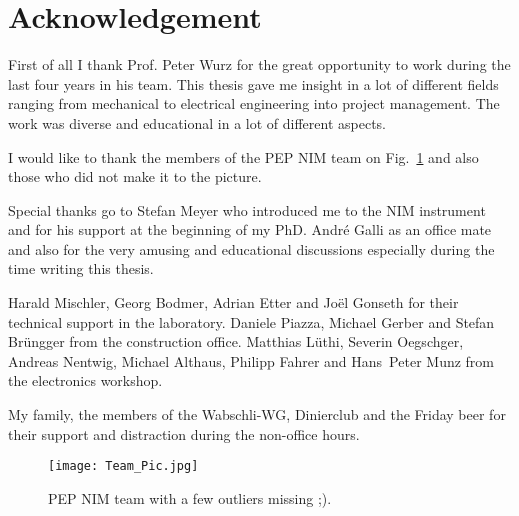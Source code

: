 \documentclass[a4paper, 12pt, abstracton]{scrartcl}
\begin{document}

	
	\newpage
	\thispagestyle{empty}
	\null
	\newpage
	
	\clearpage
	\newpage
	\thispagestyle{empty}
	\null
	\newpage
	
	\clearpage
	\newpage
	\thispagestyle{empty}
	\null
	\newpage
	
	\clearpage
	
	\clearpage
	
	\clearpage
	\newpage
	\thispagestyle{empty}
	\null
	\newpage
	
	\newpage
	\thispagestyle{empty}
	\null
	\newpage
	
	\section*{Acknowledgement}
	
	First of all I thank Prof. Peter Wurz for the great opportunity to work during the last four years in his team. This thesis gave me insight in a lot of different fields ranging from mechanical to electrical engineering into project management. The work was diverse and educational in a lot of different aspects.
	
	I would like to thank the members of the PEP NIM team on Fig.~\ref{fig:TeamPic} and also those who did not make it to the picture.
	
	Special thanks go to Stefan Meyer who introduced me to the NIM instrument and for his support at the beginning of my PhD. André Galli as an office mate and also for the very amusing and educational discussions especially during the time writing this thesis.
	
	Harald Mischler, Georg Bodmer, Adrian Etter and Joël Gonseth for their technical support in the laboratory. Daniele Piazza, Michael Gerber and Stefan Brüngger from the construction office. Matthias Lüthi, Severin Oegschger, Andreas Nentwig, Michael Althaus, Philipp Fahrer and Hans~Peter Munz from the electronics workshop.
	
	My family, the members of the Wabschli-WG, Dinierclub and the Friday beer for their support and distraction during the non-office hours.
	
	
	
	\begin{figure}[h]
		\centering
		\texttt{[image: Team\_Pic.jpg]}
		\caption{PEP NIM team with a few outliers missing ;).}
		\label{fig:TeamPic}
	\end{figure}
	
	\newpage
	\thispagestyle{empty}
	\null
	\newpage
	
	
	\newpage
	\thispagestyle{empty}
	\null
	\newpage
	
	
	\newpage
	\thispagestyle{empty}
	\null
	\newpage
	
	
\end{document}
